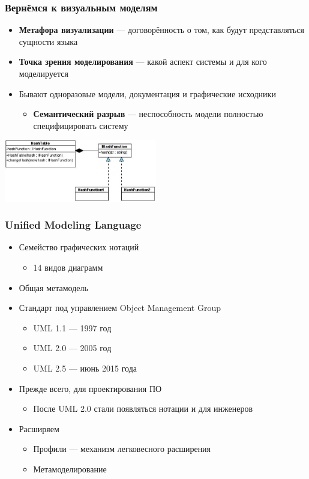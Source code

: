 \documentclass[xetex,mathserif,serif]{beamer}
\begin{document}
	\begin{frame}
		\frametitle{Вернёмся к визуальным моделям}
		\begin{itemize}
			\item \textbf{Метафора визуализации} --- договорённость о том, как будут представляться сущности языка
			\item \textbf{Точка зрения моделирования} --- какой аспект системы и для кого моделируется
			\item Бывают одноразовые модели, документация и графические исходники
			\begin{itemize}
				\item \textbf{Семантический разрыв} --- неспособность модели полностью специфицировать систему
			\end{itemize}
		\end{itemize}
		\begin{center}
			\includegraphics[width=0.5\textwidth]{hashTable.png}
		\end{center}
	\end{frame}

	\begin{frame}
		\frametitle{Unified Modeling Language}
		\begin{itemize}
			\item Семейство графических нотаций
			\begin{itemize}
				\item 14 видов диаграмм
			\end{itemize}
			\item Общая метамодель
			\item Стандарт под управлением Object Management Group
			\begin{itemize}
				\item UML 1.1 --- 1997 год
				\item UML 2.0 --- 2005 год
				\item UML 2.5 --- июнь 2015 года
			\end{itemize}
			\item Прежде всего, для проектирования ПО
			\begin{itemize}
				\item После UML 2.0 стали появляться нотации и для инженеров
			\end{itemize}
			\item Расширяем
			\begin{itemize}
				\item Профили --- механизм легковесного расширения
				\item Метамоделирование
			\end{itemize}
		\end{itemize}
	\end{frame}
\end{document}
